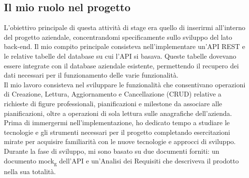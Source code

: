\subsection{Il mio ruolo nel progetto}

L'obiettivo principale di questa attività di stage era quello di inserirmi all'interno del progetto aziendale, concentrandomi specificamente sullo sviluppo del lato back-end. Il mio compito principale consisteva nell'implementare un'API REST e le relative tabelle del database su cui l'API si basava. Queste tabelle dovevano essere integrate con il database aziendale esistente, permettendo il recupero dei dati necessari per il funzionamento delle varie funzionalità.\\
Il mio lavoro consisteva nel sviluppare le funzionalità che consentivano operazioni di Creazione, Lettura, Aggiornamento e Cancellazione (CRUD) relative a richieste di figure professionali, pianificazioni e milestone da associare alle pianificazioni, oltre a operazioni di sola lettura sulle anagrafiche dell'azienda.\\
Prima di immergermi nell'implementazione, ho dedicato tempo a studiare le tecnologie e gli strumenti necessari per il progetto completando esercitazioni mirate per acquisire familiarità con le nuove tecnologie e approcci di sviluppo.\\
Durante la fase di sviluppo, mi sono basato su due documenti forniti: un documento mock\textsubscript{g} dell'API e un'Analisi dei Requisiti che descriveva il prodotto nella sua totalità.



